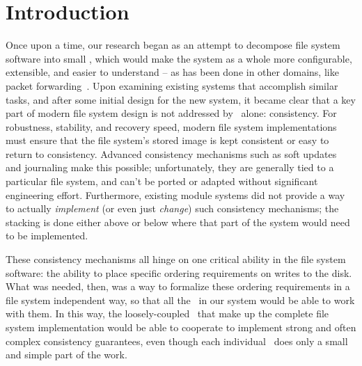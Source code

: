 \section {Introduction}
\label{sec:intro}

Once upon a time, our research began as an attempt to decompose file system
software into small \modules, which would make the system as a whole more
configurable, extensible, and easier to understand -- as has been done in other
domains, like packet forwarding~\cite{kohler00click}. Upon examining existing
systems that accomplish similar tasks, and after some initial design for the new
system, it became clear that a key part of modern file system design is not
addressed by \modules\ alone: consistency. For robustness, stability, and
recovery speed, modern file system implementations must ensure that the file
system's stored image is kept consistent or easy to return to consistency.
Advanced consistency mechanisms such as soft updates~\cite{ganger00soft} and
journaling make this possible; unfortunately, they are generally tied to a
particular file system, and can't be ported or adapted without significant
engineering effort. Furthermore, existing module systems did not provide a way
to actually \emph{implement} (or even just \emph{change}) such consistency
mechanisms; the stacking is done either above or below where that part of the
system would need to be implemented.

These consistency mechanisms all hinge on one critical ability in the file
system software: the ability to place specific ordering requirements on writes
to the disk. What was needed, then, was a way to formalize these ordering
requirements in a file system independent way, so that all the \modules\ in our
system would be able to work with them. In this way, the loosely-coupled
\modules\ that make up the complete file system implementation would be able to
cooperate to implement strong and often complex consistency guarantees, even
though each individual \module\ does only a small and simple part of the work.



